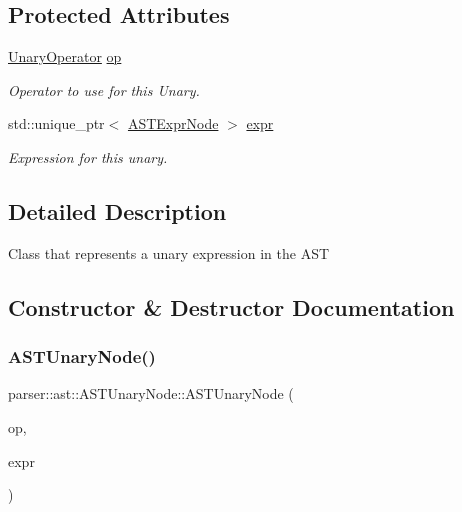 \subsection*{Protected Attributes}
\begin{DoxyCompactItemize}
\item 
\mbox{\label{classparser_1_1ast_1_1ASTUnaryNode_a23a33ca1da4fb0fa2756e938e3aea686}} 
\hyperlink{ASTUnaryNode_8h_a3bd5cd6c8af529b35a5e745ad51d5cdf}{Unary\+Operator} \hyperlink{classparser_1_1ast_1_1ASTUnaryNode_a23a33ca1da4fb0fa2756e938e3aea686}{op}
\begin{DoxyCompactList}\small\item\em Operator to use for this Unary. \end{DoxyCompactList}\item 
\mbox{\label{classparser_1_1ast_1_1ASTUnaryNode_a9c40af1c793969cdefcdbadd953ad0ca}} 
std\+::unique\+\_\+ptr$<$ \hyperlink{classparser_1_1ast_1_1ASTExprNode}{A\+S\+T\+Expr\+Node} $>$ \hyperlink{classparser_1_1ast_1_1ASTUnaryNode_a9c40af1c793969cdefcdbadd953ad0ca}{expr}
\begin{DoxyCompactList}\small\item\em Expression for this unary. \end{DoxyCompactList}\end{DoxyCompactItemize}


\subsection{Detailed Description}
Class that represents a unary expression in the A\+ST 

\subsection{Constructor \& Destructor Documentation}
\mbox{\label{classparser_1_1ast_1_1ASTUnaryNode_a13654e3c80e4e31f55ad21d6edd6ee29}} 
\subsubsection{\texorpdfstring{A\+S\+T\+Unary\+Node()}{ASTUnaryNode()}}
{\footnotesize\ttfamily parser\+::ast\+::\+A\+S\+T\+Unary\+Node\+::\+A\+S\+T\+Unary\+Node (\begin{DoxyParamCaption}\item[{\hyperlink{ASTUnaryNode_8h_a3bd5cd6c8af529b35a5e745ad51d5cdf}{Unary\+Operator}}]{op,  }\item[{std\+::unique\+\_\+ptr$<$ \hyperlink{classparser_1_1ast_1_1ASTExprNode}{A\+S\+T\+Expr\+Node} $>$}]{expr }\end{DoxyParamCaption})}


